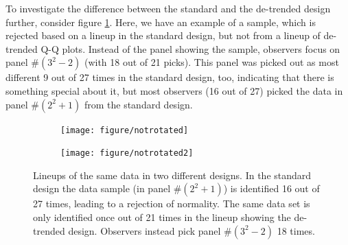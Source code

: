 \documentclass{article}\usepackage[]{graphicx}\usepackage[]{color}
\newenvironment{knitrout}{}{} %
\newcommand{\hh}[1]{{\color{magenta} #1}}
\begin{document}
% 
\hh{To investigate the difference between the standard and the de-trended design  further, consider figure \ref{fig:rotstd}. Here, we have an example of a sample, which is rejected based on a  lineup in the standard design, but not from a lineup of de-trended Q-Q plots. Instead of the panel showing the sample, observers focus on panel \#$(3^2-2)$ (with 18 out of 21 picks). This panel was picked out as most different 9 out of 27 times in the standard design, too, indicating that there is something special about it, but most observers (16 out of 27) picked the data in panel \#$(2^2+1)$ from the standard design. }
\begin{figure}[hbt]
\begin{subfigure}{0.5\textwidth}
\begin{knitrout}
\color{fgcolor}
\texttt{[image: figure/notrotated]} 

\end{knitrout}

\end{subfigure}
\begin{subfigure}{0.5\textwidth}
\begin{knitrout}
\color{fgcolor}
\texttt{[image: figure/notrotated2]} 

\end{knitrout}

\end{subfigure}
\caption{\label{fig:rotstd}Lineups of the same data in two different designs. In the standard design the data sample (in panel \#$(2^2+1)$) is identified 16 out of 27 times, leading to a rejection of normality. The same data set is only identified once out of 21 times in the lineup showing the de-trended design. Observers instead pick panel \#$(3^2-2)$ 18 times. }
\end{figure}
\end{document}

